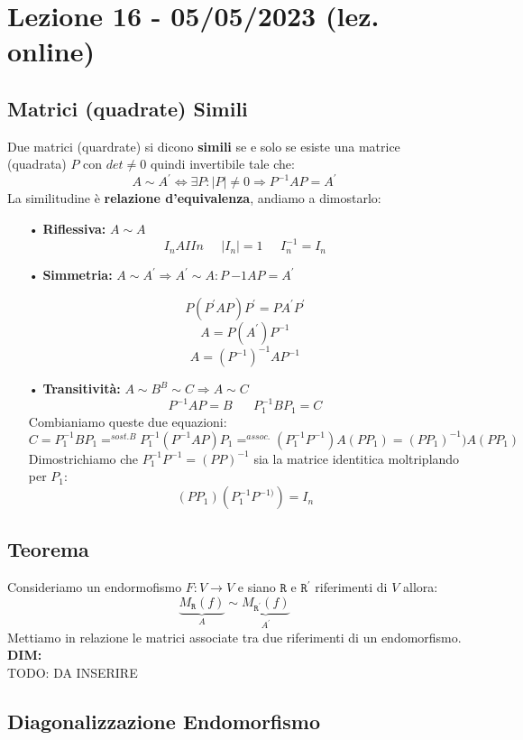 \section{Lezione 16 - 05/05/2023 (lez. online)}

\subsection{Matrici (quadrate) Simili}
Due matrici (quardrate) si dicono \textbf{simili} se e solo se esiste una matrice (quadrata) $P$ con $det \neq 0$ quindi invertibile tale che:
$$ A \sim A^{\prime} \Leftrightarrow \exists P: |P| \neq 0 \Rightarrow P^{-1}AP=A^{\prime}$$
La similitudine è \textbf{relazione d'equivalenza}, andiamo a dimostarlo:
\begin{itemize}

\item[•]\textbf{Riflessiva:} $A \sim A$
$$  I_nAIIn \;\;\;\;\; |I_n| = 1 \;\;\;\;\; I_n^{-1} = I_n$$ 

\item[•]\textbf{Simmetria:} $ A \sim A^{\prime} \Rightarrow A^{\prime} \sim A: P~{-1}AP=A^{\prime}$

$$  P(P^{\prime}AP)P^{\prime} = PA^ {\prime}P^{\prime} $$
$$ A = P(A^{\prime})P^{-1}$$
$$ A = (P^{-1})^{-1}AP^{-1} $$

\item[•]\textbf{Transitività:} $A \sim B ^ B \sim C \Rightarrow A \sim C$
$$ P^{-1}AP = B \;\;\;\;\;\; P_1^{-1}BP_1 = C$$
Combianiamo queste due equazioni:
$$ C=P_1^{-1}BP_1 =^{sost. B} P_1^{-1}(P^{-1}AP)P_1 =^{assoc.} (P_1^{-1}P^{-1})A(PP_1) = (PP_1)^{-1})A(PP_1)  $$
Dimostrichiamo che $P_1^{-1}P^{-1} = (PP)^{-1}$ sia la matrice identitica moltriplando per $P_1$:
$$ (PP_1)(P_1^{-1}P^{-1)}) = I_n $$

\end{itemize}

\subsection{Teorema}
Consideriamo un endormofismo $F: V \rightarrow V$ e siano $\mathtt{R}$ e $\mathtt{R}^{\prime}$ riferimenti di $V$ allora:
$$ \underbrace{M_{\mathtt{R}}(f)}_A  \sim \underbrace{M_{\mathtt{R}^{\prime}}(f)}_{A^{\prime}}  $$
Mettiamo in relazione le matrici associate tra due riferimenti di un endomorfismo.\\
\textbf{DIM:}\\
TODO: DA INSERIRE

\subsection{Diagonalizzazione Endomorfismo}

